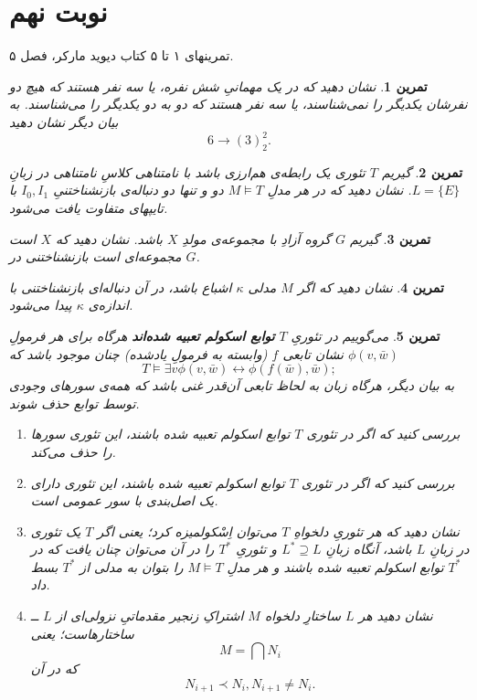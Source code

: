 \documentclass[12pt,a4paper]{report}
\theoremstyle{colorhead}
\newtheorem{tam}{تمرین}
\begin{document}
\section{نوبت نهم}
تمرینهای ۱ تا ۵ کتاب دیوید مارکر، فصل ۵. 
\begin{tam}
نشان دهید که
در یک مهمانیِ شش نفره، یا سه نفر هستند که هیچ دو نفرشان یکدیگر را نمی‌شناسند، یا سه نفر هستند که دو به دو یکدیگر را می‌شناسند. به بیان دیگر نشان دهید
\[
6\to (3)^2_2.
\]
\end{tam}
\begin{tam}
گیریم
$T$
تئوری یک رابطه‌ی هم‌ارزی باشد با نامتناهی کلاسِ نامتناهی در زبانِ
\mbox{$L=\{E\}$}.
نشان دهید که در هر مدلِ
$M\models T$
دو و تنها دو دنباله‌ی بازنشناختنیِ
$I_0,I_1$
با تایپهای متفاوت یافت می‌شود. 
\end{tam}
\begin{tam}
گیریم 
$G$
گروه آزادِ  با مجموعه‌ی مولدِ
$X$
باشد. 
نشان دهید که $X$
است مجموعه‌ای است بازنشناختنی در
$G$.
\end{tam}
\begin{tam}
نشان دهید که اگر
$M$
مدلی
$\kappa$
اشباع باشد، در آن دنباله‌ای بازنشناختنی با اندازه‌ی
$\kappa$
پیدا می‌شود. 
\end{tam}
\begin{tam}
می‌گوییم در تئوریِ
$T$
\textbf{توابع اسکولم تعبیه شده‌اند }
هرگاه برای هر فرمولِ
$\phi(v,\bar{w})$
نشان تابعی
$f$
(وابسته به فرمولِ یادشده)
چنان موجود باشد که 
\[
T\models \exists v\phi(v,\bar{w})\leftrightarrow \phi(f(\bar{w}),\bar{w});
\]
به بیان دیگر، هرگاه زبان به لحاظ تابعی آن‌قدر غنی باشد که همه‌ی سورهای وجودی توسط توابع حذف شوند. 
\begin{enumerate}
\item 
بررسی کنید که اگر در تئوری 
$T$
توابع اسکولم تعبیه شده باشند،‌ این تئوری سورها را حذف می‌کند.
\item 
بررسی کنید که اگر در تئوری 
$T$
توابع اسکولم تعبیه شده باشند،‌ این تئوری دارای یک اصل‌بندی با سور عمومی است.
\item 
نشان دهید که هر تئوریِ
دلخواهِ
$T$
 می‌توان اِسْکولمیزه کرد؛ یعنی
 اگر $T$
 یک تئوری در زبانِ
 $L$
 باشد،‌ آنگاه زبانِ
 $L^*\supseteq L$
 و تئوریِ
 $T^*$
 را در آن می‌توان چنان یافت که در
 $T^*$
 توابع اسکولم تعبیه شده باشند و هر مدلِ
 $M\models T$
 را بتوان به مدلی از
 $T^*$
 بسط داد. 
 \item 
 نشان دهید هر 
 $L$
 ساختارِ دلخواه
 $M$
 اشتراکِ زنجیر مقدماتیِ‌ نزولی‌ای از
 $L$
 ــ‌
 ساختارهاست؛ یعنی
 \[
 M=\bigcap N_i
 \]
که در آن
\[
N_{i+1}\prec N_i, N_{i+1}\not= N_i.
\] 
\end{enumerate}
\end{tam}
\newpage 
\end{document}
